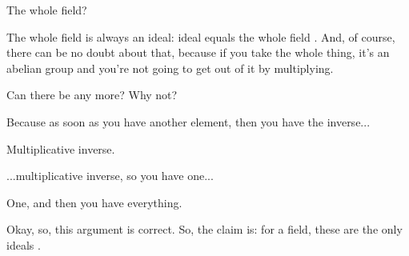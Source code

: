 \begin{student}
The whole field?
\end{student}

\begin{speech}[00:40:07 - 00:40:21]
The whole field is always an ideal: ideal equals the whole field . And, of course, there can be no doubt about that, because if you take the whole thing, it's an abelian group and you're not going to get out of it by multiplying.

Can there be any more? Why not?
\end{speech}

\begin{student}
Because as soon as you have another element, then you have the inverse...
\end{student}

\begin{speech}[00:40:26 - 00:40:28]
Multiplicative inverse.
\end{speech}

\begin{student}
...multiplicative inverse, so you have one...
\end{student}

\begin{speech}[00:40:30 - 00:40:37]
One, and then you have everything.

Okay, so, this argument is correct. So, the claim is: for a field, these are the only ideals .
\end{speech}

